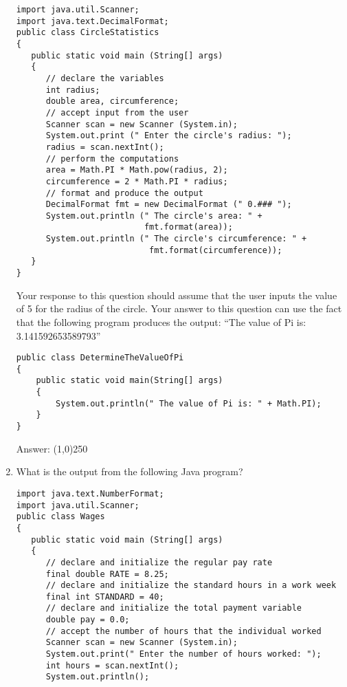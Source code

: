 \documentclass[12pt]{article}
\begin{document}
\begin{enumerate}
\hspace*{.25in}
\begin{minipage}{6in}
  \lstset{numbers=left}
  \begin{lstlisting}
import java.util.Scanner;
import java.text.DecimalFormat;
public class CircleStatistics
{
   public static void main (String[] args)
   {
      // declare the variables 
      int radius;
      double area, circumference;
      // accept input from the user
      Scanner scan = new Scanner (System.in);
      System.out.print (" Enter the circle's radius: ");
      radius = scan.nextInt();
      // perform the computations
      area = Math.PI * Math.pow(radius, 2);
      circumference = 2 * Math.PI * radius;
      // format and produce the output
      DecimalFormat fmt = new DecimalFormat (" 0.### ");
      System.out.println (" The circle's area: " + 
                          fmt.format(area));
      System.out.println (" The circle's circumference: " +
                           fmt.format(circumference));
   }
}
  \end{lstlisting}

\end{minipage}

Your response to this question should assume that the user inputs the
value of 5 for the radius of the circle. Your answer to this question
can use the fact that the following program produces the output: ``The
value of Pi is: 3.141592653589793''

\hspace*{.25in}
\begin{minipage}{6in}
  \lstset{numbers=left}
  \begin{lstlisting}
public class DetermineTheValueOfPi	
{
    public static void main(String[] args)
    {
        System.out.println(" The value of Pi is: " + Math.PI);
    }
}
  \end{lstlisting}

\end{minipage}

Answer: \line(1,0){250}

\item What is the output from the following Java program?

\hspace*{.25in}
\begin{minipage}{6in}
  \lstset{numbers=left}
  \begin{lstlisting}
import java.text.NumberFormat;
import java.util.Scanner;
public class Wages
{
   public static void main (String[] args)
   {
      // declare and initialize the regular pay rate
      final double RATE = 8.25;  
      // declare and initialize the standard hours in a work week
      final int STANDARD = 40;   
      // declare and initialize the total payment variable 
      double pay = 0.0;
      // accept the number of hours that the individual worked
      Scanner scan = new Scanner (System.in);
      System.out.print(" Enter the number of hours worked: ");
      int hours = scan.nextInt();
      System.out.println();


\end{lstlisting}
\end{minipage}
\end{enumerate}
\end{document}
